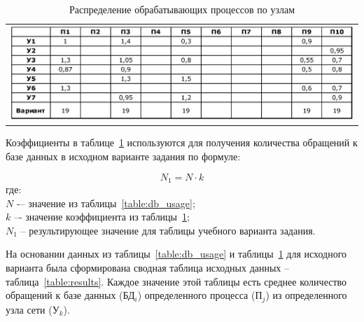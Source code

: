 \begin{table}[h]
\caption{Распределение обрабатывающих процессов по узлам}
\label{table:proc_distrib}
 \begin{tabular}{c}
 \includegraphics[width=1\linewidth]{pics/pic8_2_proc_disrib.eps}
 \end{tabular}
\end{table}

Коэффициенты в таблице~\ref{table:proc_distrib} используются для получения количества обращений к базе данных в исходном варианте задания по формуле:

$$N_1 = N\cdot k$$
где:\\
$N$ -– значение из таблицы~\ref{table:db_usage};\\
$k$ –- значение коэффициента из таблицы~\ref{table:proc_distrib};\\
$N_1$ -- результирующее значение для таблицы учебного варианта задания.\par\bigskip

\newpage

На основании данных из таблицы~\ref{table:db_usage} и таблицы~\ref{table:proc_distrib} для исходного варианта была сформирована сводная таблица исходных данных -- таблица~\ref{table:results}. Каждое значение этой таблицы есть среднее количество обращений к базе данных (БД$_i$) определенного процесса (П$_j$) из определенного узла сети (У$_k$).


